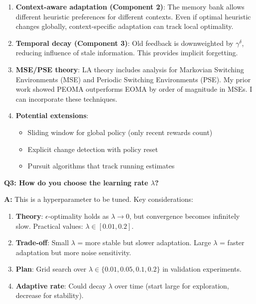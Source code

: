 \documentclass[11pt]{article}
\begin{document}
\begin{enumerate}
    \item \textbf{Context-aware adaptation (Component 2)}: The memory bank allows different heuristic preferences for different contexts. Even if optimal heuristic changes globally, context-specific adaptation can track local optimality.

    \item \textbf{Temporal decay (Component 3)}: Old feedback is downweighted by $\gamma^{\delta}$, reducing influence of stale information. This provides implicit forgetting.

    \item \textbf{MSE/PSE theory}: LA theory includes analysis for Markovian Switching Environments (MSE) and Periodic Switching Environments (PSE). My prior work showed PEOMA outperforms EOMA by order of magnitude in MSEs. I can incorporate these techniques.

    \item \textbf{Potential extensions}:
    \begin{itemize}
        \item Sliding window for global policy (only recent rewards count)
        \item Explicit change detection with policy reset
        \item Pursuit algorithms that track running estimates
    \end{itemize}
\end{enumerate}

\textbf{Q3: How do you choose the learning rate $\lambda$?}

\textbf{A:} This is a hyperparameter to be tuned. Key considerations:

\begin{enumerate}
    \item \textbf{Theory}: $\epsilon$-optimality holds as $\lambda \to 0$, but convergence becomes infinitely slow. Practical values: $\lambda \in [0.01, 0.2]$.

    \item \textbf{Trade-off}: Small $\lambda$ = more stable but slower adaptation. Large $\lambda$ = faster adaptation but more noise sensitivity.

    \item \textbf{Plan}: Grid search over $\lambda \in \{0.01, 0.05, 0.1, 0.2\}$ in validation experiments.

    \item \textbf{Adaptive rate}: Could decay $\lambda$ over time (start large for exploration, decrease for stability).
\end{enumerate}
\end{document}
